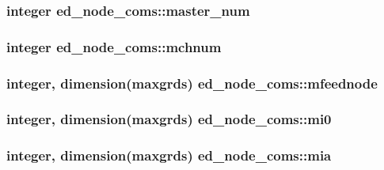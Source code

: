 \subsubsection[{master\+\_\+num}]{\setlength{\rightskip}{0pt plus 5cm}integer ed\+\_\+node\+\_\+coms\+::master\+\_\+num}\label{namespaceed__node__coms_a07ddd50e92be990673b9c78656aaade5}
\hypertarget{namespaceed__node__coms_a6eaf5989fc4f739cb5003064f0355966}{}
\subsubsection[{mchnum}]{\setlength{\rightskip}{0pt plus 5cm}integer ed\+\_\+node\+\_\+coms\+::mchnum}\label{namespaceed__node__coms_a6eaf5989fc4f739cb5003064f0355966}
\hypertarget{namespaceed__node__coms_a5de467657a345cda5f1b8bdd83cb8cb4}{}
\subsubsection[{mfeednode}]{\setlength{\rightskip}{0pt plus 5cm}integer, dimension(maxgrds) ed\+\_\+node\+\_\+coms\+::mfeednode}\label{namespaceed__node__coms_a5de467657a345cda5f1b8bdd83cb8cb4}
\hypertarget{namespaceed__node__coms_ac0ed536bf855d993b1468e7313b63c56}{}
\subsubsection[{mi0}]{\setlength{\rightskip}{0pt plus 5cm}integer, dimension(maxgrds) ed\+\_\+node\+\_\+coms\+::mi0}\label{namespaceed__node__coms_ac0ed536bf855d993b1468e7313b63c56}
\hypertarget{namespaceed__node__coms_aa872e042de37a4d54f239c536576fa3a}{}
\subsubsection[{mia}]{\setlength{\rightskip}{0pt plus 5cm}integer, dimension(maxgrds) ed\+\_\+node\+\_\+coms\+::mia}\label{namespaceed__node__coms_aa872e042de37a4d54f239c536576fa3a}
\hypertarget{namespaceed__node__coms_af8cf428b242766c5d3114bd5053ce26d}{}
